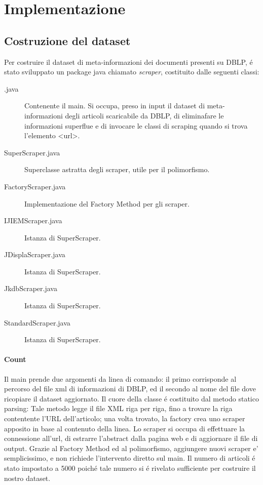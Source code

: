 \documentclass[11pt,a4paper]{article}
\begin{document}
\section{Implementazione}
\label{sec:implementation}


\subsection{Costruzione del dataset}
Per costruire il dataset di meta-informazioni dei documenti presenti su DBLP, \'e stato sviluppato un package java chiamato \emph{scraper}, costituito dalle seguenti classi:
\begin{description}
	\item[.java] Contenente il main. Si occupa, preso in input il dataset di meta-informazioni degli articoli scaricabile da DBLP, di eliminafare le informazioni superflue e di invocare le classi di scraping quando si trova l'elemento <url>.
	\item[SuperScraper.java] Superclasse astratta degli scraper, utile per il polimorfismo.
	\item[FactoryScraper.java] Implementazione del Factory Method per gli scraper.
	\item[IJIEMScraper.java] Istanza di SuperScraper.
	\item[JDisplaScraper.java] Istanza di SuperScraper.
	\item[JkdbScraper.java] Istanza di SuperScraper.
	\item[StandardScraper.java] Istanza di SuperScraper.
\end{description}

\paragraph{Count}
\label{par:count}



Il main prende due argomenti da linea di comando: il primo corrisponde al percorso del file xml di informazioni di DBLP, ed il secondo al nome del file dove ricopiare il dataset aggiornato. Il cuore della classe \'e costituito dal metodo statico parsing: Tale metodo legge il file XML riga per riga, fino a trovare la riga contentente l'URL dell'articolo; una volta trovato, la factory crea uno scraper apposito in base al contenuto della linea. Lo scraper si occupa di effettuare la connessione all'url, di estrarre l'abstract dalla pagina web e di aggiornare il file di output. Grazie al Factory Method ed al polimorfismo, aggiungere nuovi scraper e' semplicissimo, e non richiede l'intervento diretto sul main. Il numero di articoli \'e stato impostato a 5000 poich\'e tale numero si \'e rivelato sufficiente per costruire il nostro dataset.
\end{document}
